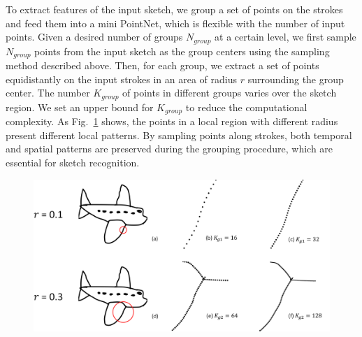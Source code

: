 \vspace{0.1cm}
To extract features of the input sketch, we group a set of points on the strokes and feed them into a mini PointNet, which is flexible with the number of input points.
%
Given a desired number of groups $N_{group}$ at a certain level, we first sample $N_{group}$ points from the input sketch as the group centers using the sampling method described above.
%
Then, for each group, we extract a set of points equidistantly on the input strokes in an area of radius $r$ surrounding the group center.
%
The number $K_{group}$ of points in different groups varies over the sketch region. We set an upper bound for $K_{group}$ to reduce the computational complexity.
%
As Fig.~\ref{fig:group} shows, the points in a local region with different radius present different local patterns.
%
By sampling points along strokes, both temporal and spatial patterns are preserved during the grouping procedure, which are essential for sketch recognition.


\begin{figure}
	\centering
	\includegraphics[width=\columnwidth]{images/group.png}
	\label{fig:group}
\end{figure}


